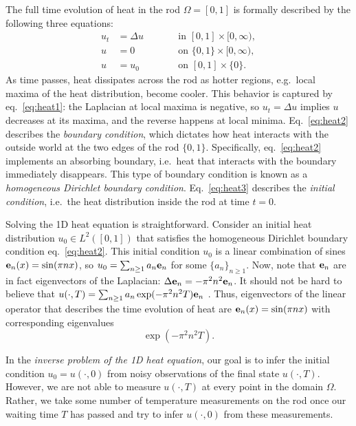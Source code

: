 The full time evolution of heat in the rod $\Omega=[0,1]$ is formally
described by the following three equations:
\begin{subequations}
  \begin{alignat}{2}
    u_t &= \Delta u &&\qquad \text{in } [0,1] \times [0,\infty), \label{eq:heat1}\\
    u &= 0 &&\qquad \text{on } \{0, 1\} \times [0,\infty), \label{eq:heat2}\\
    u &= u_0 &&\qquad \text{on }[0,1] \times \{0\}. \label{eq:heat3}
  \end{alignat}
\end{subequations}
As time passes, heat dissipates across the rod as hotter regions,
e.g.~local maxima of the heat distribution, become cooler. This
behavior is captured by eq.~\eqref{eq:heat1}: the Laplacian at local
maxima is negative, so $u_t = \Delta u$ implies $u$ decreases at its
maxima, and the reverse happens at local minima. Eq.~\eqref{eq:heat2}
describes the \emph{boundary condition}, which dictates how heat
interacts with the outside world at the two edges of the rod
$\{0,1\}$. Specifically, eq.~\eqref{eq:heat2} implements an absorbing
boundary, i.e.~heat that interacts with the boundary immediately
disappears. This type of boundary condition is known as a
\emph{homogeneous Dirichlet boundary condition}. Eq.~\eqref{eq:heat3}
describes the \emph{initial condition}, i.e.~the heat distribution
inside the rod at time $t=0$.

Solving the 1D heat equation is straightforward. Consider an initial
heat distribution $u_0\in L^2([0,1])$ that satisfies the homogeneous
Dirichlet boundary condition eq.~\eqref{eq:heat2}. This initial
condition $u_0$ is a linear combination of sines $\mathbf{e}_n(x) = \sin(\pi
n x)$, so $u_0 = \sum_{n\geq 1} a_n \mathbf{e}_n$ for some $\{a_n\}_{n\geq
  1}$. Now, note that $\mathbf{e}_n$ are in fact eigenvectors of the
Laplacian: $\Delta \mathbf{e}_n = -\pi^2 n^2\mathbf{e}_n$. It should not be hard to
believe that $u(\cdot, T) = \sum_{n\geq 1} a_n \exp(-\pi^2 n^2T )
\mathbf{e}_n$ \cite{renardy2006PDE}. Thus, eigenvectors of the linear
operator that describes the time evolution of heat are $\mathbf{e}_n(x) =
\sin(\pi n x)$ with corresponding eigenvalues
\begin{equation}\label{eq:decay}
  \exp(-\pi^2 n^2T ).
\end{equation}

In the \emph{inverse problem of the 1D heat equation}, our goal is to
infer the initial condition $u_0 = u(\cdot, 0)$ from noisy
observations of the final state $u(\cdot, T)$. However, we are not
able to measure $u(\cdot, T)$ at every point in the domain
$\Omega$. Rather, we take some number of temperature measurements on
the rod once our waiting time $T$ has passed and try to infer
$u(\cdot, 0)$ from these measurements.


